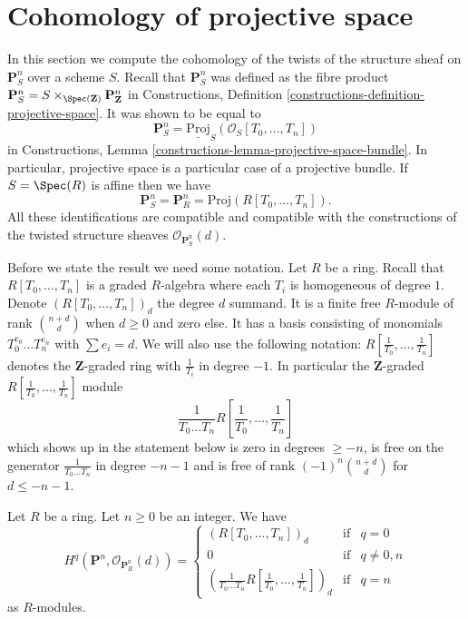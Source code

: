 \section{Cohomology of projective space}
\label{section-cohomology-projective-space}

\noindent
In this section we compute the cohomology of the twists of the
structure sheaf on $\mathbf{P}^n_S$ over a scheme $S$.
Recall that $\mathbf{P}^n_S$ was defined as the fibre product
$
\mathbf{P}^n_S = S \times_{\Spec(\mathbf{Z})} \mathbf{P}^n_{\mathbf{Z}}
$
in Constructions, Definition \ref{constructions-definition-projective-space}.
It was shown to be equal to
$$
\mathbf{P}^n_S = \underline{\text{Proj}}_S(\mathcal{O}_S[T_0, \ldots, T_n])
$$
in Constructions, Lemma \ref{constructions-lemma-projective-space-bundle}.
In particular, projective space is a particular case of a projective bundle.
If $S = \Spec(R)$ is affine then we have
$$
\mathbf{P}^n_S = \mathbf{P}^n_R = \text{Proj}(R[T_0, \ldots, T_n]).
$$
All these identifications are compatible and compatible with the constructions
of the twisted structure sheaves $\mathcal{O}_{\mathbf{P}^n_S}(d)$.

\medskip\noindent
Before we state the result we need some notation.
Let $R$ be a ring.
Recall that $R[T_0, \ldots, T_n]$ is a graded
$R$-algebra where each $T_i$ is homogeneous of degree $1$.
Denote $(R[T_0, \ldots, T_n])_d$ the degree $d$ summand.
It is a finite free $R$-module of rank $\binom{n + d}{d}$
when $d \geq 0$ and zero else.
It has a basis consisting of monomials $T_0^{e_0} \ldots T_n^{e_n}$
with $\sum e_i = d$. We will also use the following notation:
$R[\frac{1}{T_0}, \ldots, \frac{1}{T_n}]$ denotes the $\mathbf{Z}$-graded
ring with $\frac{1}{T_i}$ in degree $-1$. In particular the
$\mathbf{Z}$-graded $R[\frac{1}{T_0}, \ldots, \frac{1}{T_n}]$ module
$$
\frac{1}{T_0 \ldots T_n} R[\frac{1}{T_0}, \ldots, \frac{1}{T_n}]
$$
which shows up in the statement below is zero in degrees
$\geq -n$, is free on the generator $\frac{1}{T_0 \ldots T_n}$
in degree $-n - 1$ and is free of rank $(-1)^n\binom{n + d}{d}$ for
$d \leq -n - 1$.

\begin{lemma}
\label{lemma-cohomology-projective-space-over-ring}
\begin{reference}
\cite[III Proposition 2.1.12]{EGA}
\end{reference}
Let $R$ be a ring.
Let $n \geq 0$ be an integer.
We have
$$
H^q(\mathbf{P}^n, \mathcal{O}_{\mathbf{P}^n_R}(d)) =
\left\{
\begin{matrix}
(R[T_0, \ldots, T_n])_d & \text{if} & q = 0 \\
0 & \text{if} & q \not = 0, n \\
\left(\frac{1}{T_0 \ldots T_n} R[\frac{1}{T_0}, \ldots, \frac{1}{T_n}]\right)_d
& \text{if} & q = n
\end{matrix}
\right.
$$
as $R$-modules.
\end{lemma}

